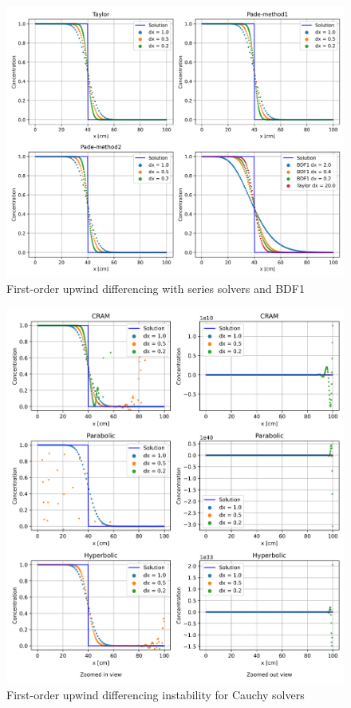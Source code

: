 \begin{figure}[p]
    \centering
    \includegraphics[width=6in]{images/chapter-5/progressionProblems/problem3/problem3FirstOrder.png}
    \caption{First-order upwind differencing with series solvers and BDF1}
    \label{fig:first_order_results}
\end{figure}

\clearpage

\begin{figure}[p]
    \centering
    \includegraphics[width=6.0in]{images/chapter-5/progressionProblems/problem3/problem3FirstOrderCauchyInstability.png}
    \caption{First-order upwind differencing instability for Cauchy solvers}
    \label{fig:first_order_results_cauchy_instability}
\end{figure}

